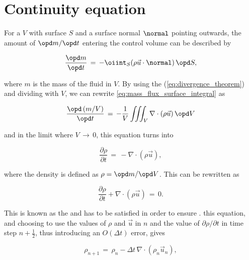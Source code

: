 \section{Continuity equation}

For a  $V$ with surface $S$ and a surface normal $\normal$ pointing outwards, the amount of  $\opd m/\opd t$ entering the control volume can be described by

\begin{equation} \label{eq:mass_flux_surface_integral}
\frac{\opd m}{\opd t} \,=\, -\oiint_S(\rho\vec{u}\cdot\normal)\,\opd S,
\end{equation}

where $m$ is the mass of the fluid in $V$. By using the  (\eqref{eq:divergence_theorem}) and dividing with $V$, we can rewrite \eqref{eq:mass_flux_surface_integral} as

\begin{equation} \label{eq:mass_flux_volume_integral}
\frac{\opd\,(m/V)}{\opd t} \,=\, -\frac{1}{V}\iiint_V\nabla\cdot(\rho\vec{u})\,\opd V
\end{equation}

and in the limit where $V \,\rightarrow\, 0$, this equation turns into

\begin{equation} \label{eq:density_partial_time_derivative}
\frac{\partial \rho}{\partial t} \,=\, -\nabla\cdot(\rho\vec{u}),
\end{equation}

where the density is defined as $\rho = \opd m/\opd V$. This can be rewritten as

\begin{equation} \label{eq:continuity_equation}
\frac{\partial \rho}{\partial t} + \nabla\cdot(\rho\vec{u}) \,=\, 0.
\end{equation}

This is known as the  and has to be satisfied in order to ensure .  this equation, and choosing to use the values of $\rho$ and $\vec{u}$ in \timestep $n$ and the value of $\partial \rho/\partial t$ in time step $n+\frac{1}{2}$, thus introducing an $O(\Delta t)$ error, gives

\begin{equation} \label{eq:continuity_equation_time_discretized}
\rho_{n+1} \,=\, \rho_{n} - \Delta t\,\nabla\cdot(\rho_{n}\vec{u}_{n}),
\end{equation}

